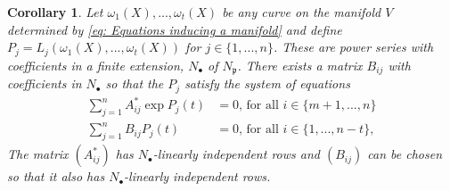 \documentclass{article}
\newtheorem{corollary}{Corollary}[section]
\newcommand{\mfrak}[1]{\mathfrak{#1}}
\begin{document}
\begin{corollary}\label{cor: Any curve on V gives a solution to a system of equations}
    Let $\omega_1(X), ..., \omega_t(X)$ be any curve on the manifold $V$ determined by \cref{eq: Equations inducing a manifold} and define $P_j = L_j(\omega_1(X), ..., \omega_t(X))$ for $j \in \{1, ..., n\}$. These are power series with coefficients in a finite extension, $N_\bullet$ of $N_\mfrak p$. There exists a matrix $B_{ij}$ with coefficients in $N_\bullet$ so that the $P_j$ satisfy the system of equations
    \begin{equation}\label{eq: System that can also be solved}
    \begin{aligned}
        \sum_{j=1}^n A^*_{ij}\exp P_j(t) &= 0 \text{, for all } i \in \{ m+1, ..., n \} \\
        \sum_{j=1}^n B_{ij}P_j(t) &= 0 \text{, for all } i \in \{1,  ..., n-t\},
    \end{aligned}
\end{equation}
    The matrix $(A^*_{ij})$ has     $N_\bullet$-linearly independent rows and $(B_{ij})$ can be chosen so that it also has $N_\bullet$-linearly independent rows. 
\end{corollary}
\end{document}
